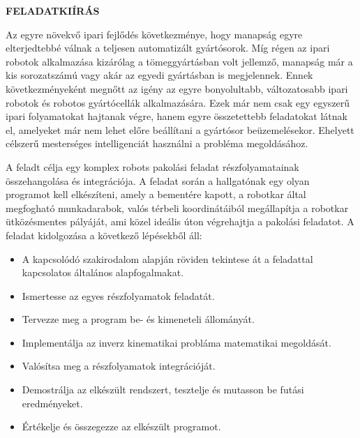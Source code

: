 \clearpage
\begin{center}
\large
\textbf{FELADATKIÍRÁS}\\
\end{center}


Az egyre növekvő ipari fejlődés következménye, hogy manapság egyre elterjedtebbé
válnak a teljesen automatizált gyártósorok. Míg régen az ipari robotok alkalmazása
kizárólag a tömeggyártásban volt jellemző, manapság már a kis sorozatszámú vagy akár
az egyedi gyártásban is megjelennek. Ennek következményeként megnőtt az igény az
egyre bonyolultabb, változatosabb ipari robotok és robotos gyártócellák alkalmazására.
Ezek már nem csak egy egyszerű ipari folyamatokat hajtanak végre, hanem egyre
összetettebb feladatokat látnak el, amelyeket már nem lehet előre beállítani a gyártósor
beüzemelésekor. Ehelyett célszerű mesterséges intelligenciát használni a probléma
megoldásához.

A feladt célja egy komplex robots pakolási feladat részfolyamatainak összehangolása és integrációja.
A feladat során a hallgatónak egy olyan programot kell elkészíteni, amely a bementére kapott,
a robotkar által megfogható munkadarabok, valós térbeli koordinátáiból megállapítja a robotkar 
ütközésmentes pályáját, ami közel ideális úton végrehajtja a pakolási feladatot. 
A feladat kidolgozása a következő lépésekből áll:

\begin{itemize}
    \item A kapcsolódó szakirodalom alapján röviden tekintese át a feladattal kapcsolatos általános alapfogalmakat.
    \item Ismertesse az egyes részfolyamatok feladatát.
    \item Tervezze meg a program be- és kimeneteli állományát.
    \item Implementálja az inverz kinematikai probláma matematikai megoldását.
    \item Valósítsa meg a részfolyamatok integrációját.
    \item Demostrálja az elkészült rendszert, tesztelje és mutasson be futási eredményeket.
    \item Értékelje és összegezze az elkészült programot.
\end{itemize}